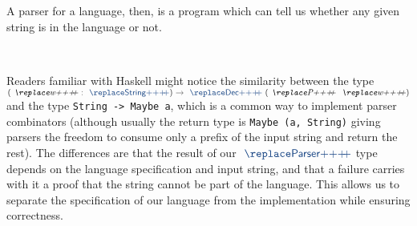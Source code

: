 \begin{code}%
%
\>[4]\AgdaSpace{}%
\AgdaSpace{}%
\AgdaSymbol{(}\AgdaSpace{}%
\AgdaSymbol{:}\AgdaSpace{}%
\AgdaSymbol{)}\AgdaSpace{}%
\AgdaSymbol{:}\AgdaSpace{}%
\AgdaSpace{}%
\<%
\\
\>[4][@{}l@{\AgdaIndent{0}}]%
\>[8]\AgdaSpace{}%
\AgdaSymbol{:}\AgdaSpace{}%
\AgdaSpace{}%
\AgdaSpace{}%
\AgdaSpace{}%
\<%
\\
%
\>[8]\AgdaSpace{}%
\AgdaSymbol{:}\AgdaSpace{}%
\AgdaSpace{}%
\AgdaSpace{}%
\AgdaSpace{}%
\AgdaSpace{}%
\<%
\end{code}

A parser for a language, then, is a program which can tell us whether any given string is in the language or not.

\begin{code}%
%
\>[4]\AgdaSpace{}%
\AgdaSymbol{:}\AgdaSpace{}%
\AgdaSpace{}%
\AgdaSpace{}%
\<%
\\
%
\>[4]\AgdaSpace{}%
\AgdaSpace{}%
\AgdaSymbol{=}\AgdaSpace{}%
\AgdaSymbol{(}\AgdaSpace{}%
\AgdaSymbol{:}\AgdaSpace{}%
\AgdaSymbol{)}\AgdaSpace{}%
\AgdaSpace{}%
\AgdaSpace{}%
\AgdaSymbol{(}\AgdaSpace{}%
\AgdaSymbol{)}\<%
\end{code}

\begin{remark}
Readers familiar with Haskell might notice the similarity between the type $\as{(}\ab{w}~\as{:}~\af{String}\as{)}~\as{→}~\af{Dec}~\as{(}\ab{P}~\ab{w}\as{)}$ and the type \verb|String -> Maybe a|, which is a common way to implement parser combinators (although usually the return type is \verb|Maybe (a, String)| giving parsers the freedom to consume only a prefix of the input string and return the rest).
The differences are that the result of our $\af{Parser}$ type depends on the language specification and input string, and that a failure carries with it a proof that the string cannot be part of the language.
This allows us to separate the specification of our language from the implementation while ensuring correctness.
\end{remark}

